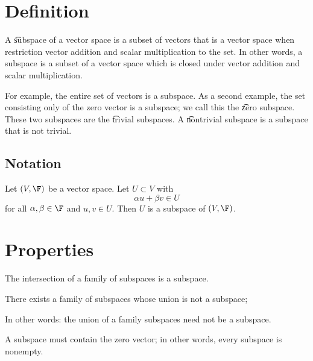 
\section*{Definition}

A \t{subspace} of a vector space is a subset of vectors that is a vector space when restriction vector addition and scalar multiplication to the set.
In other words, a subspace is a subset of a vector space which is closed under vector addition and scalar multiplication.

For example, the entire set of vectors is a subspace.
As a second example, the set consisting only of the zero vector is a subspace; we call this the \t{zero subspace}.
These two subspaces are the \t{trivial subspaces}.
A \t{nontrivial subspace} is a subspace that is not trivial.

\subsection*{Notation}

Let $(V, \F )$ be a vector space.
Let $U \subset V$ with
\[
\alpha  u + \beta  v \in U
\]
for all $\alpha , \beta  \in \F $ and $u, v \in U$.
Then $U$ is a subspace of $(V, \F )$.

\section*{Properties}

\begin{proposition}
The intersection of a family of subspaces is a subspace.
\end{proposition}

\begin{proposition}
There exists a family of subspaces whose union is not a subspace;
\begin{remark}
In other words: the union of a family subspaces need not be a subspace.
\end{remark}

\end{proposition}

\begin{proposition}
A subspace must contain the zero vector; in other words, every subspace is nonempty.
\end{proposition}

\blankpage